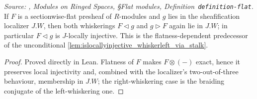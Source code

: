 \begin{lemma}
  \label{lem:flat_preserves_W}
  \textit{Source: \cite{stacks-project}, Modules on Ringed Spaces, \S Flat modules,
  Definition~\texttt{definition-flat}.}
  If \(F\) is a sectionwise-flat presheaf of \(R\)-modules and \(g\) lies in the
  sheafification localizer \(J.W\), then both whiskerings \(F \triangleleft g\) and
  \(g \triangleright F\) again lie in \(J.W\); in particular \(F \triangleleft g\) is
  \(J\)-locally injective. This is the flatness-dependent predecessor of the
  unconditional \cref{lem:islocallyinjective_whiskerleft_via_stalk}.
\end{lemma}
\begin{proof}
  Proved directly in Lean. Flatness of \(F\) makes \(F \otimes (-)\) exact, hence it
  preserves local injectivity and, combined with the localizer's two-out-of-three
  behaviour, membership in \(J.W\); the right-whiskering case is the braiding conjugate
  of the left-whiskering one.
\end{proof}

